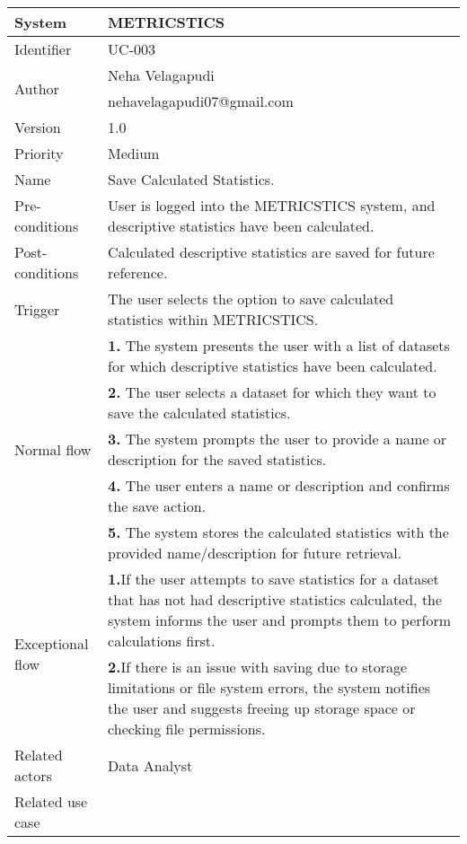 \begin{table}[htb]
    \centering
    \begin{tabular}{|p{4cm}|p{12cm}|} \hline 
         System &  METRICSTICS\\ \hline 
         
         Identifier & UC-003 \\ \hline 
         
         \multirow{2}{*}{Author} & Neha Velagapudi  \\
         &nehavelagapudi07@gmail.com \\
           \hline 
           Version & 1.0\\ \hline
         
         Priority &  Medium\\ \hline 
         
         Name & Save Calculated Statistics. \\ \hline 
         Pre-conditions & User is logged into the METRICSTICS system, and descriptive statistics have been calculated. \\ \hline 
         Post-conditions & Calculated descriptive statistics are saved for future reference. \\ \hline
         Trigger & The user selects the option to save calculated statistics within METRICSTICS. \\ \hline
        \multirow{5}{*}{Normal flow} 
        & \textbf{1.}   The system presents the user with a list of datasets for which descriptive statistics have been calculated. \\ 
        & \textbf{2.}  The user selects a dataset for which they want to save the calculated statistics. \\ 
          & \textbf{3.}   The system prompts the user to provide a name or description for the saved statistics. \\ 
        & \textbf{4.}  The user enters a name or description and confirms the save action. \\ 
          & \textbf{5.}  The system stores the calculated statistics with the provided name/description for future retrieval. \\ 
       
         
        
        \hline
         \multirow{2}{*}{Exceptional flow} 
        & \textbf{1.}If the user attempts to save statistics for a dataset that has not had descriptive statistics calculated, the system informs the user and prompts them to perform calculations first. \\ 
        & \textbf{2.}If there is an issue with saving due to storage limitations or file system errors, the system notifies the user and suggests freeing up storage space or checking file permissions. \\  \hline 
        Related actors & Data Analyst \\ \hline
        Related use case &  \\ \hline
    \end{tabular}
    \caption{}
    \label{tab:my_label}
\end{table}

